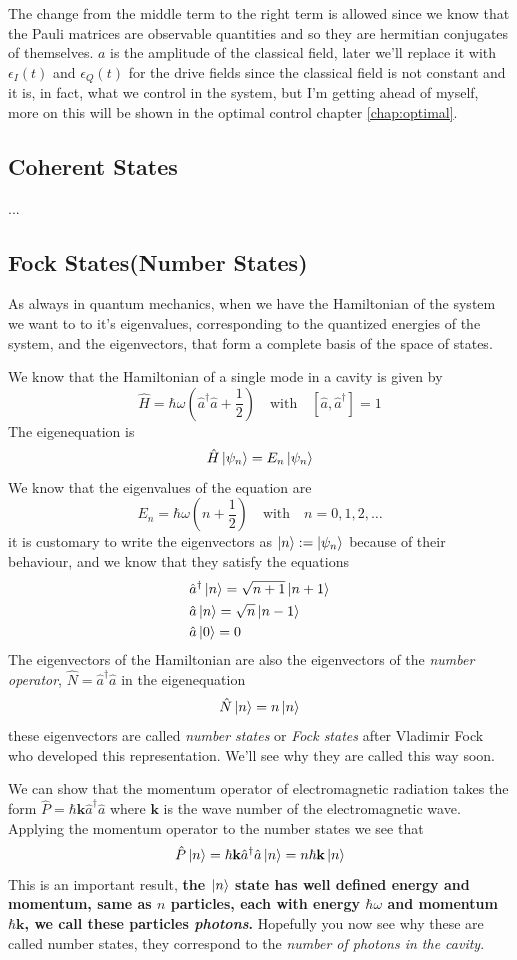\documentclass[english, a4paper, 12pt, twoside]{article}
\numberwithin{equation}{section} %
\begin{document}
The change from the middle term to the right term is allowed since we know that the Pauli matrices are observable quantities and so they are hermitian conjugates of themselves. $a$ is the amplitude of the classical field, later we'll replace it with $\epsilon_I(t)$ and $\epsilon_Q(t)$ for the drive fields since the classical field is not constant and it is, in fact, what we control in the system, but I'm getting ahead of myself, more on this will be shown in the optimal control chapter \ref{chap:optimal}.

\subsection{Coherent States}
...
\subsection{Fock States(Number States)}
As always in quantum mechanics, when we have the Hamiltonian of the system we want to to it's eigenvalues, corresponding to the quantized energies of the system, and the eigenvectors, that form a complete basis of the space of states.

We know that the Hamiltonian of a single mode in a cavity is given by
\[
    \hat{H} = \hbar \omega (\hat{a}^\dag \hat{a} + \frac{1}{2}) \quad \text{with} \quad [\hat{a}, \hat{a}^\dag] = 1
\]
The eigenequation is
\[
    \hat{H}\ket{\psi_n} = E_n \ket{\psi_n}
\]
We know that the eigenvalues of the equation are
\[
    E_n = \hbar \omega (n + \frac{1}{2}) \quad \text{with} \quad n = 0, 1, 2, \dots
\]
it is customary to write the eigenvectors as $\ket{n} := \ket{\psi_n}$ because of their behaviour, and we know that they satisfy the equations
\begin{align*}
    &\hat{a}^\dag \ket{n} = \sqrt{n+1}\ket{n+1} \\
    &\hat{a} \ket{n} = \sqrt{n}\ket{n-1} \\
    &\hat{a}\ket{0} = 0
\end{align*}
The eigenvectors of the Hamiltonian are also the eigenvectors of the \textit{number operator}, $\hat{N} = \hat{a}^\dag \hat{a}$ in the eigenequation
\[
    \hat{N}\ket{n} = n\ket{n}
\]
these eigenvectors are called \textit{number states} or \textit{Fock states} after Vladimir Fock who developed this representation. We'll see why they are called this way soon.

We can show that the momentum operator of electromagnetic radiation takes the form $\hat{P} = \hbar \textbf{k} \hat{a}^\dag \hat{a}$ where $\textbf{k}$ is the wave number of the electromagnetic wave. Applying the momentum operator to the number states we  see that
\[
    \hat{P}\ket{n} =  \hbar \textbf{k} \hat{a}^\dag \hat{a} \ket{n} = n\hbar \textbf{k}\ket{n}
\]
This is an important result, \textbf{the $\ket{n}$ state has well defined energy and momentum, same as $n$ particles, each with energy $\hbar \omega$ and momentum $\hbar \textbf{k}$, we call these particles \textit{photons}.} Hopefully you now see why these are called number states, they correspond to the \textit{number of photons in the cavity}.
\end{document}
